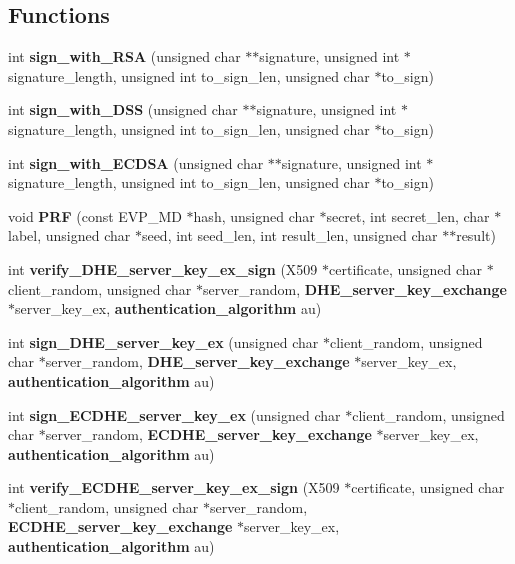 \subsection*{Functions}
\begin{DoxyCompactItemize}
\item 
int {\bf sign\+\_\+with\+\_\+\+R\+SA} (unsigned char $\ast$$\ast$signature, unsigned int $\ast$signature\+\_\+length, unsigned int to\+\_\+sign\+\_\+len, unsigned char $\ast$to\+\_\+sign)
\item 
int {\bf sign\+\_\+with\+\_\+\+D\+SS} (unsigned char $\ast$$\ast$signature, unsigned int $\ast$signature\+\_\+length, unsigned int to\+\_\+sign\+\_\+len, unsigned char $\ast$to\+\_\+sign)
\item 
int {\bf sign\+\_\+with\+\_\+\+E\+C\+D\+SA} (unsigned char $\ast$$\ast$signature, unsigned int $\ast$signature\+\_\+length, unsigned int to\+\_\+sign\+\_\+len, unsigned char $\ast$to\+\_\+sign)
\item 
void {\bf P\+RF} (const E\+V\+P\+\_\+\+MD $\ast$hash, unsigned char $\ast$secret, int secret\+\_\+len, char $\ast$label, unsigned char $\ast$seed, int seed\+\_\+len, int result\+\_\+len, unsigned char $\ast$$\ast$result)
\item 
int {\bf verify\+\_\+\+D\+H\+E\+\_\+server\+\_\+key\+\_\+ex\+\_\+sign} (X509 $\ast$certificate, unsigned char $\ast$client\+\_\+random, unsigned char $\ast$server\+\_\+random, {\bf D\+H\+E\+\_\+server\+\_\+key\+\_\+exchange} $\ast$server\+\_\+key\+\_\+ex, {\bf authentication\+\_\+algorithm} au)
\item 
int {\bf sign\+\_\+\+D\+H\+E\+\_\+server\+\_\+key\+\_\+ex} (unsigned char $\ast$client\+\_\+random, unsigned char $\ast$server\+\_\+random, {\bf D\+H\+E\+\_\+server\+\_\+key\+\_\+exchange} $\ast$server\+\_\+key\+\_\+ex, {\bf authentication\+\_\+algorithm} au)
\item 
int {\bf sign\+\_\+\+E\+C\+D\+H\+E\+\_\+server\+\_\+key\+\_\+ex} (unsigned char $\ast$client\+\_\+random, unsigned char $\ast$server\+\_\+random, {\bf E\+C\+D\+H\+E\+\_\+server\+\_\+key\+\_\+exchange} $\ast$server\+\_\+key\+\_\+ex, {\bf authentication\+\_\+algorithm} au)
\item 
int {\bf verify\+\_\+\+E\+C\+D\+H\+E\+\_\+server\+\_\+key\+\_\+ex\+\_\+sign} (X509 $\ast$certificate, unsigned char $\ast$client\+\_\+random, unsigned char $\ast$server\+\_\+random, {\bf E\+C\+D\+H\+E\+\_\+server\+\_\+key\+\_\+exchange} $\ast$server\+\_\+key\+\_\+ex, {\bf authentication\+\_\+algorithm} au)
\end{DoxyCompactItemize}


